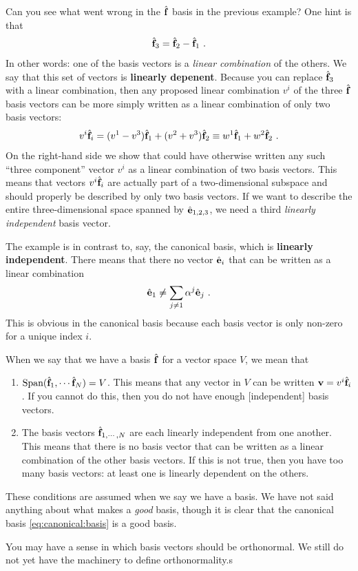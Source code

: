 Can you see what went wrong in the $\hat{\mathbf{f}}$ basis in the previous example? One hint is that
\begin{align}
    \hat{\mathbf{f}}_3 = \hat{\mathbf{f}}_2 - \hat{\mathbf{f}}_1 \ .
\end{align}
In other words: one of the basis vectors is a \emph{linear combination} of the others. We say that this set of vectors is \textbf{linearly depenent}.  Because you can replace $\hat{\mathbf{f}}_3$ with a linear combination, then any proposed linear combination $v^i$ of the three $\hat{\mathbf{f}}$ basis vectors can be more simply written as a linear combination of only two basis vectors:
\begin{align}
    v^i \hat{\mathbf{f}}_i = (v^1-v^3)\hat{\mathbf{f}}_1 + (v^2+v^3)\hat{\mathbf{f}}_2 \equiv w^1 \hat{\mathbf{f}}_1 + w^2\hat{\mathbf{f}}_2 \ .
\end{align}
On the right-hand side we show that could have otherwise written any such ``three component'' vector $v^i$ as a linear combination of two basis vectors. This means that vectors $v^i\hat{\mathbf{f}}_i$ are actually part of a two-dimensional subspace and should properly be described by only two basis vectors. If we want to describe the entire three-dimensional space spanned by $\hat{\mathbf{e}}_{1,2,3}$, we need a third \emph{linearly independent} basis vector. 

The example is in contrast to, say, the canonical basis, which is \textbf{linearly independent}. There means that there no vector $\hat{\mathbf{e}}_i$ that can be written as a linear combination
\begin{align}
    \hat{\mathbf{e}}_1 \neq \sum_{j \neq 1} \alpha^j \hat{\mathbf{e}}_j \ .
\end{align}
This is obvious in the canonical basis because each basis vector is only non-zero for a unique index $i$.


\begin{bigidea}[Basis]
When we say that we have a basis $\hat{\mathbf{f}}$ for a vector space $V$, we mean that
\begin{enumerate}
    \item $\textnormal{Span}(\hat{\mathbf{f}}_1, \cdots \hat{\mathbf{f}}_N) = V$. This means that any vector in $V$ can be written $\mathbf{v} = v^i \hat{\mathbf{f}}_i$. If you cannot do this, then you do not have enough [independent] basis vectors.
    \item The basis vectors $\hat{\mathbf{f}}_{1,\cdots,N}$ are each linearly independent from one another. This means that there is no basis vector that can be written as a linear combination of the other basis vectors. If this is not true, then you have too many basis vectors: at least one is linearly dependent on the others.
\end{enumerate}
These conditions are assumed when we say we have a basis. We have not said anything about what makes a \emph{good} basis, though it is clear that the canonical basis \eqref{eq:canonical:basis} is a good basis.
\end{bigidea}
You may have a sense in which basis vectors should be orthonormal. We still do not yet have the machinery to define orthonormality.s



